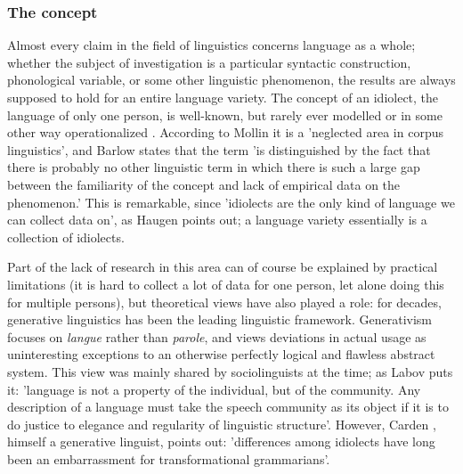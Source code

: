 \documentclass[11pt]{article}
\begin{document}
\subsubsection{The concept}
Almost every claim in the field of linguistics concerns language as a whole; whether the subject of investigation is a particular syntactic construction, phonological variable, or some other linguistic phenomenon, the results are always supposed to hold for an entire language variety. The concept of an idiolect, the language of only one person, is well-known, but rarely ever modelled or in some other way operationalized \cite{mollin09,barlow10,louwerse04}. According to Mollin  it is a 'neglected area in corpus linguistics', and Barlow  states that the term 'is distinguished by the fact that there is probably no other linguistic term in which there is such a large gap between the familiarity of the concept and lack of empirical data on the phenomenon.' This is remarkable, since 'idiolects are the only kind of language we can collect data on', as Haugen  points out; a language variety essentially is a collection of idiolects.

Part of the lack of research in this area can of course be explained by practical limitations (it is hard to collect a lot of data for one person, let alone doing this for multiple persons), but theoretical views have also played a role: for decades, generative linguistics has been the leading linguistic framework. Generativism focuses on \emph{langue} rather than \emph{parole}, and views deviations in actual usage as uninteresting exceptions to an otherwise perfectly logical and flawless abstract system. This view was mainly shared by sociolinguists at the time; as Labov  puts it: 'language is not a property of the individual, but of the community. Any description of a language must take the speech community as its object if it is to do justice to elegance and regularity of linguistic structure'. However, Carden , himself a generative linguist, points out: 'differences among idiolects have long been an embarrassment for transformational grammarians'.
\end{document}
